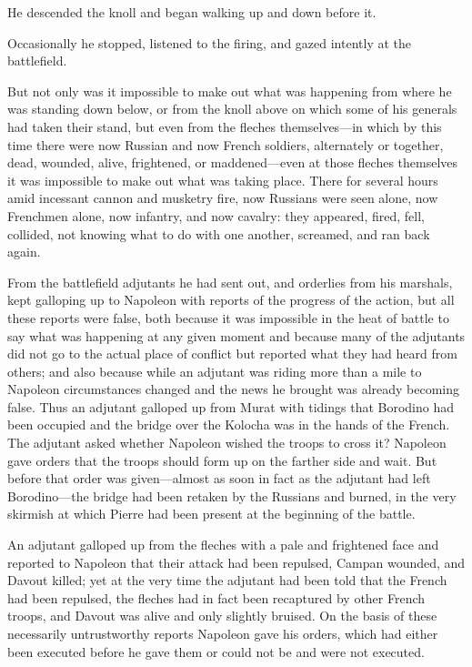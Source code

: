 He descended the knoll and began walking up and down before it.

Occasionally he stopped, listened to the firing, and gazed
intently at the battlefield.

But not only was it impossible to make out what was happening
from where he was standing down below, or from the knoll above on
which some of his generals had taken their stand, but even from
the fleches themselves---in which by this time there were now
Russian and now French soldiers, alternately or together, dead,
wounded, alive, frightened, or maddened---even at those fleches
themselves it was impossible to make out what was taking
place. There for several hours amid incessant cannon and musketry
fire, now Russians were seen alone, now Frenchmen alone, now
infantry, and now cavalry: they appeared, fired, fell, collided,
not knowing what to do with one another, screamed, and ran back
again.

From the battlefield adjutants he had sent out, and orderlies
from his marshals, kept galloping up to Napoleon with reports of
the progress of the action, but all these reports were false,
both because it was impossible in the heat of battle to say what
was happening at any given moment and because many of the
adjutants did not go to the actual place of conflict but reported
what they had heard from others; and also because while an
adjutant was riding more than a mile to Napoleon circumstances
changed and the news he brought was already becoming false. Thus
an adjutant galloped up from Murat with tidings that Borodino had
been occupied and the bridge over the Kolocha was in the hands of
the French. The adjutant asked whether Napoleon wished the troops
to cross it? Napoleon gave orders that the troops should form up
on the farther side and wait. But before that order was
given---almost as soon in fact as the adjutant had left
Borodino---the bridge had been retaken by the Russians and
burned, in the very skirmish at which Pierre had been present at
the beginning of the battle.

An adjutant galloped up from the fleches with a pale and
frightened face and reported to Napoleon that their attack had
been repulsed, Campan wounded, and Davout killed; yet at the very
time the adjutant had been told that the French had been
repulsed, the fleches had in fact been recaptured by other French
troops, and Davout was alive and only slightly bruised. On the
basis of these necessarily untrustworthy reports Napoleon gave
his orders, which had either been executed before he gave them or
could not be and were not executed.

